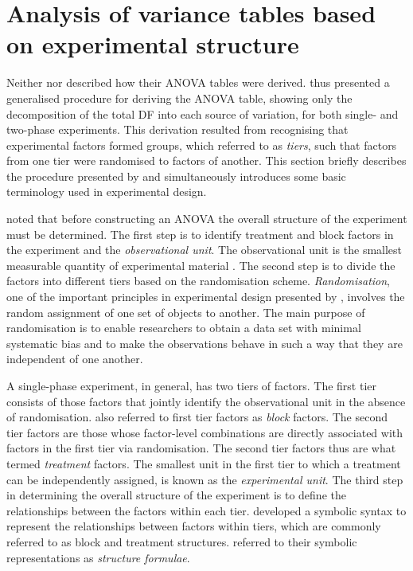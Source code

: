 \section{Analysis of variance tables based on experimental structure}
\label{sec:Brien1983}
Neither \cite{McIntyre1955} nor \cite{Curnow1959} described how their ANOVA tables were derived. \cite{Brien1983} thus presented a generalised procedure for deriving the ANOVA table, showing only the decomposition of the total DF into each source of variation, for both single- and two-phase experiments. This derivation resulted from recognising that experimental factors formed groups, which \cite{Brien1983} referred to as \emph{tiers}, such that factors from one tier were randomised to factors of another. This section briefly describes the procedure presented by \cite{Brien1983} and simultaneously introduces some basic terminology used in experimental design.

\cite{Brien1983} noted that before constructing an ANOVA the overall structure of the experiment must be determined. The first step is to identify  treatment and block factors in the experiment and the \emph{observational unit}. The observational unit is the smallest measurable quantity of experimental material \citep{Bailey2008}. The second step is to divide the factors into different tiers based on the randomisation scheme. \emph{Randomisation}, one of the important principles in experimental design presented by \cite{Fisher1935}, involves the random assignment of one set of objects to another. The main purpose of randomisation is to enable researchers to obtain a data set with minimal systematic bias and to make the observations behave in such a way that they are independent of one another. 

A single-phase experiment, in general, has two tiers of factors. The first tier consists of those factors that jointly identify the observational unit in the absence of randomisation. \cite{Nelder1965A} also referred to first tier factors as \emph{block} factors. The second tier factors are those whose factor-level combinations are directly associated with factors in the first tier via randomisation. The second tier factors thus are what \cite{Nelder1965B} termed \emph{treatment} factors. The smallest unit in the first tier to which a treatment can be independently assigned, is known as the \emph{experimental unit}. The third step in determining the overall structure of the experiment is to define the relationships between the factors within each tier. \cite{Wilkinson1973} developed a symbolic syntax to represent the relationships between factors within tiers, which are commonly referred to as block and treatment structures. \cite{Brien1999} referred to their symbolic representations as \emph{structure formulae}.

